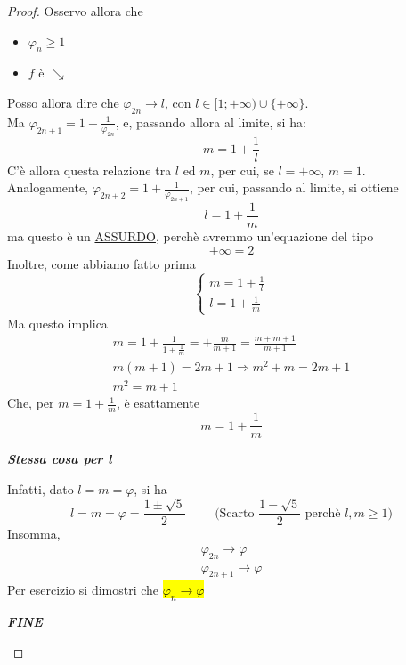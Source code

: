 \documentclass{article}
\theoremstyle{definition}
\begin{document}
\begin{proof}
Osservo allora che
\begin{itemize}
    \item $\varphi_n \geqslant 1$
    \item $f$ è $\searrow$
\end{itemize}
Posso allora dire che $\varphi_{2n} \to l$, con $l \in [1;+\infty) \cup \{+\infty\}$.
\\
Ma $\varphi_{2n+1}=1+\frac{1}{\varphi_{2n}}$, e, passando allora al limite, si ha:
\begin{equation}
    m=1 + \frac{1}{l}
\end{equation}
C'è allora questa relazione tra $l$ ed $m$, per cui, se $l= +\infty$, $m=1$.
\\
Analogamente, $\varphi_{2n+2}=1+\frac{1}{\varphi_{2n+1}}$, per cui, passando al limite, si ottiene
\begin{equation}
    l=1+\frac{1}{m}
\end{equation}
ma questo è un \underline{ASSURDO}, perchè avremmo un'equazione del tipo
\begin{equation}
    +\infty=2
\end{equation}
Inoltre, come abbiamo fatto prima
\begin{equation}
    \begin{cases}
        m=1+\frac{1}{l} \\
        l= 1 +\frac{1}{m}
    \end{cases}
\end{equation}
Ma questo implica
\begin{align*}
       m=1+\frac{1}{1+\frac{1}{m}}=+\frac{m}{m+1}=\frac{m+m+1}{m+1} \\
       m(m+1)=2m+1 \Longrightarrow m^2+m=2m+1\\
       m^2=m+1
\end{align*}
Che, per $m=1+\frac{1}{m}$, è esattamente
\begin{equation}
    m=1+\frac{1}{m}
\end{equation}
\begin{center}
    \textbf{\textit{Stessa cosa per l}}
\end{center}
Infatti, dato $l=m=\varphi$, si ha
\begin{equation*}
    l=m=\varphi=\frac{1 \pm \sqrt{5}}{2} \,\,\,\,\,\,\,\,\,\,\,\,\,\, \mbox{(Scarto $\frac{1 - \sqrt{5}}{2}$ perchè $l,m \geqslant 1$)}
\end{equation*}
Insomma,
\begin{align}
    \varphi_{2n} \to \varphi \\
    \varphi_{2n+1} \to \varphi
\end{align}
Per esercizio si dimostri che \hl{ $\varphi_n \to \varphi$}
\begin{center}
    \textbf{\textit{FINE}}
\end{center}




    
\end{proof}
\end{document}
